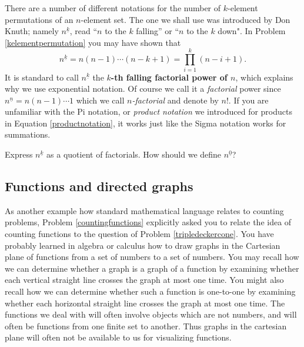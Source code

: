 There are a number of different notations for the number of $k$-element
permutations of an $n$-element set.  The one we shall use was introduced by
Don Knuth; namely $n^{\underline{k}}$, read ``$n$ to the $k$ falling'' or
``$n$ to the $k$ down". In Problem \ref{kelementpermutation} you may have
shown that 
\begin{equation}n^{\underline{k}} =n(n-1)\cdots (n-k+1)= \prod_{i=1}^k(
n-i+1).\label{productnotation}
\end{equation}
  It is standard to call $n^{\underline{k}}$  the
{\bf
$k$-th falling factorial power of $n$}, which explains why we use exponential
notation.  Of course we call it a {\em factorial} power since
$n^{\underline{n}} = n(n-1)\cdots 1$ which we call {\em $n$-factorial} and
denote by
$n!$.  If you are unfamiliar with the Pi
notation, or {\em product notation} we introduced for products in Equation
\ref{productnotation}, it works just like the Sigma notation works for
summations.

\bp
\iteme Express $n^{\underline{k}}$ as a quotient of factorials.
\itemi How should we define $n^{\underline{0}}$?
\ep


\subsection{Functions and directed graphs} 

As another example how standard mathematical language relates to
counting problems, Problem \ref{countingfunctions} explicitly asked
you to relate the idea of counting functions to the question of
Problem \ref{tripledeckercone}.  You have probably learned in algebra
or calculus how to draw graphs in the Cartesian plane of functions
from a set of numbers to a set of numbers.  You may recall how we can
determine whether a graph is a graph of a function by examining
whether each vertical straight line crosses the graph at most one
time.  You might also recall how we can determine whether such a
function is one-to-one by examining whether each horizontal straight
line crosses the graph at most one time.  The functions we deal with
will often involve objects which are not numbers, and will often be
functions from one finite set to another.  Thus graphs in the
cartesian plane will often not be available to us for visualizing
functions.  

